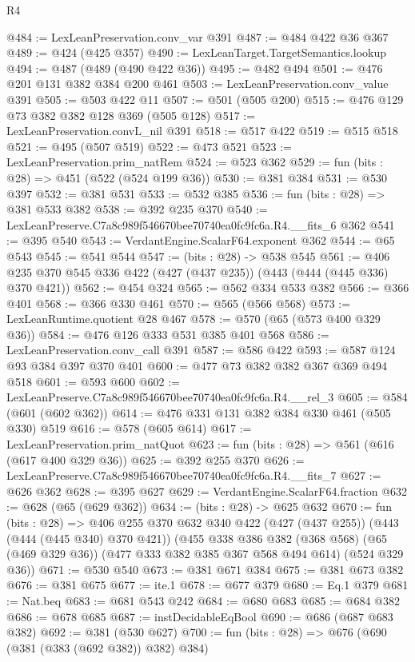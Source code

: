 \begin{lexlean}{R4}
\begin{coremodule}
@484 := LexLeanPreservation.conv_var @391
@487 := @484 @422 @36 @367
@489 := @424 (@425 @357)
@490 := LexLeanTarget.TargetSemantics.lookup
@494 := @487 (@489 (@490 @422 @36))
@495 := @482 @494
@501 := @476 @201 @131 @382 @384 @200 @461
@503 := LexLeanPreservation.conv_value @391
@505 := @503 @422 @11
@507 := @501 (@505 @200)
@515 := @476 @129 @73 @382 @382 @128 @369 (@505 @128)
@517 := LexLeanPreservation.convL_nil @391
@518 := @517 @422
@519 := @515 @518
@521 := @495 (@507 @519)
@522 := @473 @521
@523 := LexLeanPreservation.prim_natRem
@524 := @523 @362
@529 := fun (bits : @28) => @451 (@522 (@524 @199 @36))
@530 := @381 @384
@531 := @530 @397
@532 := @381 @531
@533 := @532 @385
@536 := fun (bits : @28) => @381 @533 @382
@538 := @392 @235 @370
@540 := LexLeanPreserve.C7a8c989f546670bee70740ea0fc9fc6a.R4.__fits_6 @362
@541 := @395 @540
@543 := VerdantEngine.ScalarF64.exponent @362
@544 := @65 @543
@545 := @541 @544
@547 := (bits : @28) -> @538 @545
@561 := @406 @235 @370 @545 @336 @422 (@427 (@437 @235)) (@443 (@444 (@445 @336) @370 @421))
@562 := @454 @324
@565 := @562 @334 @533 @382
@566 := @366 @401
@568 := @366 @330 @461
@570 := @565 (@566 @568)
@573 := LexLeanRuntime.quotient @28 @467
@578 := @570 (@65 (@573 @400 @329 @36))
@584 := @476 @126 @333 @531 @385 @401 @568
@586 := LexLeanPreservation.conv_call @391
@587 := @586 @422
@593 := @587 @124 @93 @384 @397 @370 @401
@600 := @477 @73 @382 @382 @367 @369 @494 @518
@601 := @593 @600
@602 := LexLeanPreserve.C7a8c989f546670bee70740ea0fc9fc6a.R4.__rel_3
@605 := @584 (@601 (@602 @362))
@614 := @476 @331 @131 @382 @384 @330 @461 (@505 @330) @519
@616 := @578 (@605 @614)
@617 := LexLeanPreservation.prim_natQuot
@623 := fun (bits : @28) => @561 (@616 (@617 @400 @329 @36))
@625 := @392 @255 @370
@626 := LexLeanPreserve.C7a8c989f546670bee70740ea0fc9fc6a.R4.__fits_7
@627 := @626 @362
@628 := @395 @627
@629 := VerdantEngine.ScalarF64.fraction
@632 := @628 (@65 (@629 @362))
@634 := (bits : @28) -> @625 @632
@670 := fun (bits : @28) =>
  @406
    @255
    @370
    @632
    @340
    @422
    (@427 (@437 @255))
    (@443 (@444 (@445 @340) @370 @421))
    (@455
      @338
      @386
      @382
      (@368 @568)
      (@65 (@469 @329 @36))
      (@477 @333 @382 @385 @367 @568 @494 @614)
      (@524 @329 @36))
@671 := @530 @540
@673 := @381 @671 @384
@675 := @381 @673 @382
@676 := @381 @675
@677 := ite.{1}
@678 := @677 @379
@680 := Eq.{1} @379
@681 := Nat.beq
@683 := @681 @543 @242
@684 := @680 @683
@685 := @684 @382
@686 := @678 @685
@687 := instDecidableEqBool
@690 := @686 (@687 @683 @382)
@692 := @381 (@530 @627)
@700 := fun (bits : @28) => @676 (@690 (@381 (@383 (@692 @382)) @382) @384)

\end{coremodule}
\end{lexlean}
